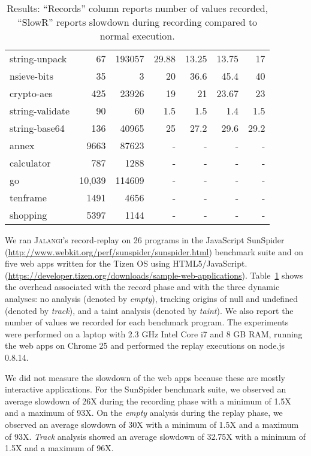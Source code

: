 \documentclass{sig-alternate}
\def\jalangi{\textsc{Jalangi}}
\begin{document}
\begin{table}
{\begin{center}
\begin{tabular}{|l|r|r|r|r|r|r|}
string-unpack& 67 & 193057 & 29.88 & 13.25 & 13.75 & 17\\
nsieve-bits& 35 & 3 & 20 & 36.6 & 45.4 & 40 \\
crypto-aes& 425 & 23926  & 19 & 21 & 23.67 & 23 \\
string-validate& 90 & 60 & 1.5 & 1.5 & 1.4 & 1.5\\
string-base64& 136 & 40965 & 25 & 27.2 & 29.6 & 29.2\\
\hline 
annex& 9663 & 87623 & - & - & - & - \\
calculator& 787 & 1288 & - & - & - & - \\
 go& 10,039 & 114609 & - & - & - & - \\
tenframe& 1491 &4656 & - & - & - & - \\
shopping& 5397 & 1144 & - & - & - & - \\
\hline 
\end{tabular}
\end{center}}
\caption{Results: ``Records'' column reports number of values
  recorded, ``SlowR'' reports
  slowdown during recording compared to normal execution.}
\label{tab:results}
\end{table}

We ran \jalangi{}'s record-replay on 26 programs in the JavaScript
SunSpider (\url{http://www.webkit.org/perf/sunspider/sunspider.html})
benchmark suite and on five web apps written for the Tizen OS using
HTML5/JavaScript.
(\url{https://developer.tizen.org/downloads/sample-web-applications}).
Table~\ref{tab:results} shows the overhead associated with the record
phase and with the three dynamic analyses: no analysis (denoted by
\emph{empty}), tracking origins of null and undefined (denoted by
\emph{track}), and a taint analysis (denoted by \emph{taint}).  We
also report the number of values we recorded for each benchmark
program.  The experiments were performed on a laptop with 2.3 GHz
Intel Core i7 and 8 GB RAM, running the web apps on Chrome 25 and
performed the replay executions on node.js 0.8.14.

We did not measure the slowdown of the web apps because these are
mostly interactive applications.  For the SunSpider benchmark suite,
we observed an average slowdown of 26X during the recording phase with
a minimum of 1.5X and a maximum of 93X.  On the \emph{empty} analysis
during the replay phase, we observed an average slowdown of 30X with a
minimum of 1.5X and a maximum of 93X.  \emph{Track} analysis showed an
average slowdown of 32.75X with a minimum of 1.5X and a maximum of
96X.
\end{document}

